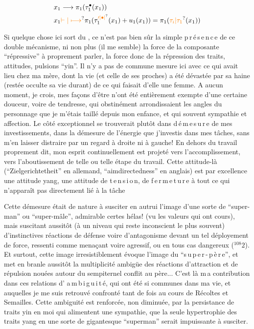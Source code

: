 \[
\begin{aligned}
x_1&\longrightarrow\pi_1(\tau_1^{\bullet}(x_1))\\
x_1&\unsure{\mathrel{\vdash}|\longmapsto}\pi_1(\tau_1^{\unsure{\prime|\bullet|}}(x_1)+u_1(x_1))
=\pi_1(\unsure{\tau_i|\tau_1}(x_1))
\end{aligned}
\]

Si quelque chose ici sort du , ce n'est pas bien sûr la simple p\,r\,é\,s\,e\,n\,c\,e de ce double mécanisme, ni non plus (il me semble) la force de la composante ``répressive'' à proprement parler, la force donc de la répression des traits, attitudes, pulsions ``yin''. Il n'y a pas de commune mesure ici avec ce qui avait lieu chez ma mère, dont la vie (et celle de ses proches) a été dévastée par sa haine (restée occulte sa vie durant) de ce qui faisait d'elle une femme. A aucun moment, je crois, mes façons d'être n'ont été entièrement exempte d'une certaine douceur, voire de tendresse, qui obstinément arrondissaient les angles du personnage que je m'étais taillé depuis mon enfance, et qui  souvent sympathie et affection. Le côté exceptionnel se trouverait plutôt dans  d\,é\,m\,e\,s\,u\,r\,e de mes investissements, dans la démesure de l'énergie que j'investis dans mes tâches, sans m'en laisser distraire par un regard à droite ni à gauche! En dehors du travail proprement dit, mon esprit continuellement est projeté vers l'accomplissement, vers l'aboutissement de telle ou telle étape du travail. Cette attitude-là (``Zielgerichtetheit'' en allemand, ``aimdirectedness'' en anglais) est par excellence une attitude yang, une attitude de t\,e\,n\,s\,i\,o\unsure{:|}\,n, de f\,e\,r\,m\,e\,t\,u\,r\,e à tout ce qui n'apparaît pas directement lié à la tâche

Cette démesure était de nature à susciter en autrui l'image d'une sorte de ``super-man'' ou ``super-mâle'', admirable certes hélas! (vu les valeurs qui ont cours), mais suscitant aussitôt (à un niveau qui reste inconscient le plus souvent) d'instinctives réactions de défense voire d'antagonisme devant un tel déployement de force, ressenti comme menaçant voire agressif, ou en tous cas dangereux (\({}^{108}2\)). Et surtout, cette image irresistiblement évoque l'image du ``s\,u\,p\,e\,r\,-\,p\,è\,r\,e'', et met en branle aussitôt la multiplicité ambigüe des réactions d'attraction et de répulsion nouées autour\unsure{:|} du sempiternel conflit au père... C'est là \unsure{:|}m\,a contribution dans ces relations d' a\,m\,b\,i\,g\,u\,i\,t\,é, qui ont été si communes dans ma vie, et auquelles je me suis retrouvé confronté tant de fois au cours de Récoltes et Semailles. Cette ambiguité est renforcée, non diminuée, par la persistance de traits yin en moi qui alimentent une sympathie, que la seule hypertrophie des traits yang en une sorte de gigantesque ``superman'' serait impuissante à susciter.

